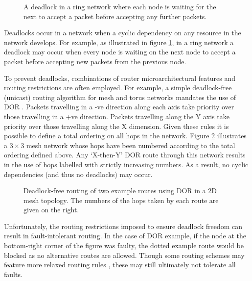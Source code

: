 			\begin{figure}
				\center
				
				\caption{A deadlock in a ring network where each node is waiting for
				the next to accept a packet before accepting any further packets.}
				\label{fig:ring-deadlock}
			\end{figure}
			
			Deadlocks occur in a network when a cyclic dependency on any resource in
			the network develops. For example, as illustrated in figure
			\ref{fig:ring-deadlock}, in a ring network a deadlock may occur when
			every node is waiting on the next node to accept a packet before
			accepting new packets from the previous node.
			
			To prevent deadlocks, combinations of router microarchitectural features
			and routing restrictions are often employed. For example, a simple
			deadlock-free (unicast) routing algorithm for mesh and torus networks
			mandates the use of DOR \cite{dally93}. Packets travelling in a -ve
			direction along each axis take priority over those travelling in a +ve
			direction. Packets travelling along the Y axis take priority over those
			travelling along the X dimension. Given these rules it is possible to
			define a total ordering on all hops in the network. Figure
			\ref{fig:deadlock-free-dor} illustrates a $3\times3$ mesh network whose
			hops have been numbered according to the total ordering defined above.
			Any `X-then-Y' DOR route through this network results in the use of hops
			labelled with strictly increasing numbers. As a result, no cyclic
			dependencies (and thus no deadlocks) may occur.
			
			\begin{figure}
				\center
			
				\caption{Deadlock-free routing of two example routes using DOR in a 2D
				mesh topology. The numbers of the hops taken by each route are given on
				the right.}
				\label{fig:deadlock-free-dor}
			\end{figure}
			
			Unfortunately, the routing restrictions imposed to ensure deadlock
			freedom can result in fault-intolerant routing. In the case of DOR
			example, if the node at the bottom-right corner of the figure was faulty,
			the dotted example route would be blocked as no alternative routes are
			allowed. Though some routing schemes may feature more relaxed routing
			rules \cite{rodrigo09}, these may still ultimately not tolerate all
			faults.
			
